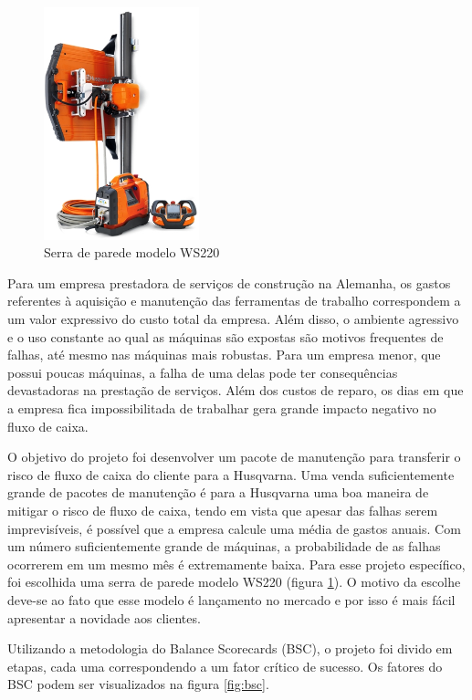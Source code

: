 \documentclass[12pt]{article}
\begin{document}
\begin{figure}[!ht]
	\centering
	\includegraphics[width=0.4\textwidth]{img/ws220_produto.png}
	\caption{Serra de parede modelo WS220}
	\label{fig:ws220_produto}
\end{figure}

	Para um empresa prestadora de serviços de construção na Alemanha, os gastos referentes à aquisição e manutenção das ferramentas de trabalho correspondem a um valor expressivo do custo total da empresa. Além disso, o ambiente agressivo e o uso constante ao qual as máquinas são expostas são motivos frequentes de falhas, até mesmo nas máquinas mais robustas. Para um empresa menor, que possui poucas máquinas, a falha de uma delas pode ter consequências devastadoras na prestação de serviços. Além dos custos de reparo, os dias em que a empresa fica impossibilitada de trabalhar gera grande impacto negativo no fluxo de caixa.

	O objetivo do projeto foi desenvolver um pacote de manutenção para transferir o risco de fluxo de caixa do cliente para a Husqvarna. Uma venda suficientemente grande de pacotes de manutenção é para a Husqvarna uma boa maneira de mitigar o risco de fluxo de caixa, tendo em vista que apesar das falhas serem imprevisíveis, é possível que a empresa calcule uma média de gastos anuais. Com um número suficientemente grande de máquinas, a probabilidade de as falhas ocorrerem em um mesmo mês é extremamente baixa. Para esse projeto específico, foi escolhida uma serra de parede modelo WS220 (figura \ref{fig:ws220_produto}). O motivo da escolhe deve-se ao fato que esse modelo é lançamento no mercado e por isso é mais fácil apresentar a novidade aos clientes.

	Utilizando a metodologia do Balance Scorecards (BSC), o projeto foi divido em etapas, cada uma correspondendo a um fator crítico de sucesso. Os fatores do BSC podem ser visualizados na figura \ref{fig:bsc}. 
	
\end{document}
